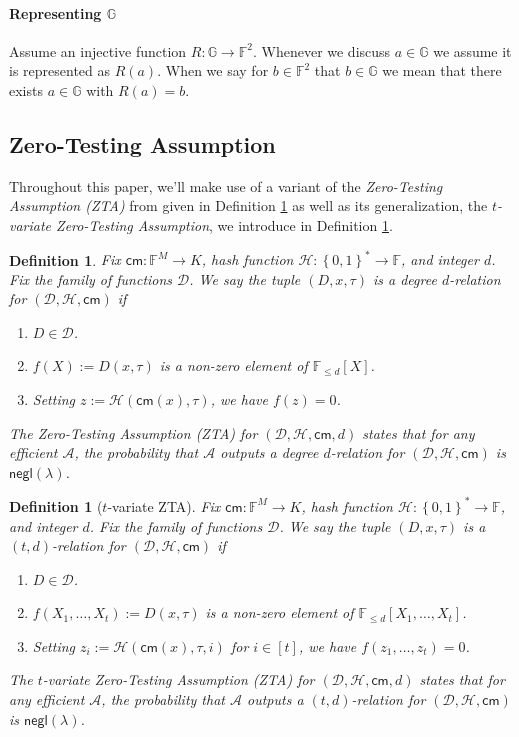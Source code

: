 \documentclass[11pt]{article} %
\newcommand{\G}{\ensuremath{{\mathbb G}}\xspace}
\newcommand{\F}{\ensuremath{\mathbb F}\xspace}
\newcommand{\adv}{\ensuremath{\mathcal A}\xspace}
\newcommand{\cm}{\ensuremath{\mathsf{cm}}\xspace}
\newcommand{\negl}{\ensuremath{\mathsf{negl}(\lambda)}\xspace}
\newcommand{\defeq}{:=}
\newcommand{\B}{\ensuremath{\set{0,1}}\xspace}
\newcommand{\hash}{\ensuremath{\mathcal{H}}\xspace}
\newcommand{\set}[1]{\ensuremath{\left\{#1\right\}}\xspace}
\newcommand{\polysofdegeq}[1]{\ensuremath{\F_{\leq #1}[X]}\xspace}
\newtheorem{dfn}[lemma]{Definition}
\newcommand{\ztafuncs}{\ensuremath{\mathcal{D}}\xspace}
\begin{document}
\paragraph{Representing \G}
Assume an injective function $R:\G \to \F^2$.
Whenever we discuss $a\in \G$ we assume it is represented as  $R(a)$.
When we say for $b\in \F^2$ that $b\in \G$ we mean that there exists $a\in \G$ with $R(a)=b$.

\subsection{Zero-Testing Assumption}
Throughout this paper, we'll make use of a variant of the \emph{Zero-Testing Assumption (ZTA)} from \cite{novarecursive} given in Definition \ref{dfn:ZTA} as well as its generalization, the \emph{$t$-variate Zero-Testing Assumption}, we introduce in Definition \ref{dfn:multiZTA}.

\begin{dfn}\label{dfn:ZTA}
Fix $\cm:\F^M\to K$, hash function $\hash:\B^*\to \F$, and integer $d$. Fix the family of functions \ztafuncs. 
We say the tuple $(D,x,\tau)$ is a \emph{degree $d$-relation for $(\ztafuncs,\hash,\cm)$} if
\begin{enumerate}
 \item $D\in \ztafuncs$.
 \item $f(X)\defeq D(x,\tau)$ is a non-zero element of \polysofdegeq{d}.
 \item Setting $z\defeq \hash(\cm(x),\tau)$, we have $f(z)=0$.
\end{enumerate}
The Zero-Testing Assumption (ZTA) for $(\ztafuncs,\hash,\cm,d)$ states that for any efficient \adv, the probability that 
\adv outputs a degree $d$-relation for $(\ztafuncs,\hash,\cm)$ is \negl.
\end{dfn}

\begin{dfn}[$t$-variate ZTA]\label{dfn:multiZTA}
Fix $\cm:\F^M\to K$, hash function $\hash:\B^*\to \F$, and integer $d$. Fix the family of functions \ztafuncs.
We say the tuple $(D,x,\tau)$ is a \emph{$(t,d)$-relation for $(\ztafuncs,\hash,\cm)$} if
\begin{enumerate}
 \item $D\in \ztafuncs$.
 \item $f(X_1,\ldots,X_t)\defeq D(x,\tau)$ is a non-zero element of $\F_{\leq d}[X_1,\ldots,X_t]$.
 \item Setting $z_i\defeq \hash(\cm(x),\tau,i)$ for $i\in[t]$, we have $f(z_1,\ldots,z_t)=0$.
\end{enumerate}
The $t$-variate Zero-Testing Assumption (ZTA) for $(\ztafuncs,\hash,\cm,d)$ states that for any efficient \adv, the probability that
\adv outputs a $(t,d)$-relation for $(\ztafuncs,\hash,\cm)$ is \negl.
\end{dfn}
\end{document}
